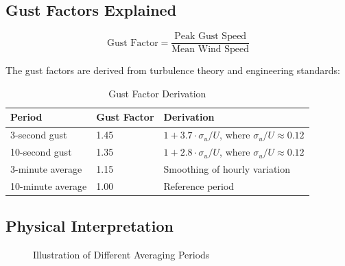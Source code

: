 \documentclass[12pt]{article}
\begin{document}
\subsection{Gust Factors Explained}

\begin{equation}
\text{Gust Factor} = \frac{\text{Peak Gust Speed}}{\text{Mean Wind Speed}}
\end{equation}

The gust factors are derived from turbulence theory and engineering standards:

\begin{table}[H]
\centering
\caption{Gust Factor Derivation}
\begin{tabular}{|l|l|l|}
\hline
\textbf{Period} & \textbf{Gust Factor} & \textbf{Derivation} \\
\hline
3-second gust & 1.45 & $1 + 3.7 \cdot \sigma_u / U$, where $\sigma_u / U \approx 0.12$ \\
10-second gust & 1.35 & $1 + 2.8 \cdot \sigma_u / U$, where $\sigma_u / U \approx 0.12$ \\
3-minute average & 1.15 & Smoothing of hourly variation \\
10-minute average & 1.00 & Reference period \\
\hline
\end{tabular}
\end{table}

\subsection{Physical Interpretation}

\begin{figure}[H]
\centering
{}
\caption{Illustration of Different Averaging Periods}
\label{fig:averaging}
\end{figure}
\end{document}
